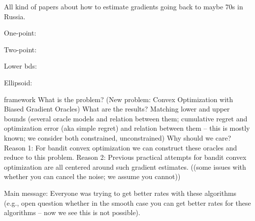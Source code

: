 All kind of papers about how to estimate gradients going back to maybe 70s in Russia.

One-point: \cite{flaxman2005online}

Two-point: \cite{AgDeXi10}

Lower bds: \cite{raginsky2011information} \cite{Chen88:LB-AoS}

Ellipsoid: \cite{AgFoHsuKaRa13:SIAM}



 framework
What is the problem? (New problem: Convex Optimization with Biased Gradient Oracles)
What are the results? Matching lower and upper bounds (several oracle models and relation between them; cumulative regret and optimization error (aka simple regret) and relation between them -- this is mostly known; we consider both constrained, unconstrained)
Why should we care?
Reason 1: For bandit convex optimization we can construct these oracles and reduce to this problem.
Reason 2: Previous practical attempts for bandit convex optimization are all centered around such gradient estimates.
((some issues with whether you can cancel the noise; we assume you cannot))

Main message: Everyone was trying to get better rates with these algorithms (e.g., open question whether in the smooth case you can get better rates for these algorithms -- now we see this is not possible).
\fi
